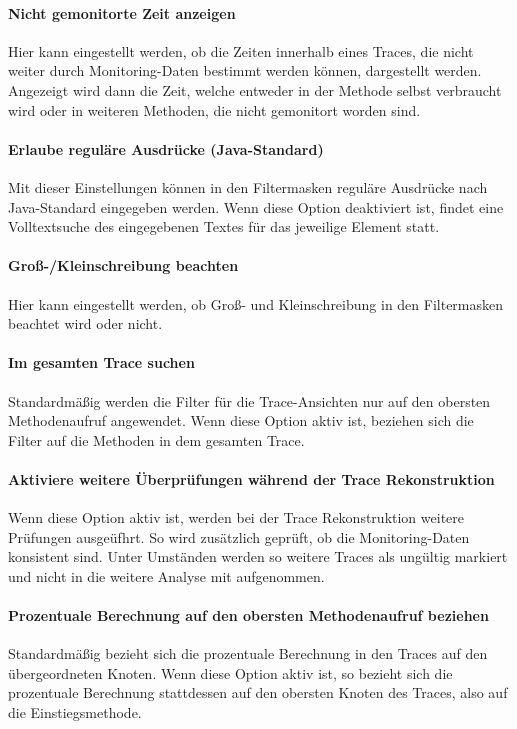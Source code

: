 \documentclass{article}
\begin{document}
  \paragraph{Nicht gemonitorte Zeit anzeigen}
  Hier kann eingestellt werden, ob die Zeiten innerhalb eines Traces, die nicht weiter durch Monitoring-Daten bestimmt werden können, dargestellt werden.
  Angezeigt wird dann die Zeit, welche entweder in der Methode selbst verbraucht wird oder in weiteren Methoden, die nicht gemonitort worden sind. 

  \paragraph{Erlaube reguläre Ausdrücke (Java-Standard)}
  Mit dieser Einstellungen können in den Filtermasken reguläre Ausdrücke nach Java-Standard eingegeben werden.
  Wenn diese Option deaktiviert ist, findet eine Volltextsuche des eingegebenen Textes für das jeweilige Element statt.

  \paragraph{Groß-/Kleinschreibung beachten}
  Hier kann eingestellt werden, ob Groß- und Kleinschreibung in den Filtermasken beachtet wird oder nicht.

  \paragraph{Im gesamten Trace suchen} 
  Standardmäßig werden die Filter für die Trace-Ansichten nur auf den obersten Methodenaufruf angewendet.
  Wenn diese Option aktiv ist, beziehen sich die Filter auf die Methoden in dem gesamten Trace.

  \paragraph{Aktiviere weitere Überprüfungen während der Trace Rekonstruktion}
  Wenn diese Option aktiv ist, werden bei der Trace Rekonstruktion weitere Prüfungen ausgeüfhrt.
  So wird zusätzlich geprüft, ob die Monitoring-Daten konsistent sind.
  Unter Umständen werden so weitere Traces als ungültig markiert und nicht in die weitere Analyse mit aufgenommen.

  \paragraph{Prozentuale Berechnung auf den obersten Methodenaufruf beziehen}
  Standardmäßig bezieht sich die prozentuale Berechnung in den Traces auf den übergeordneten Knoten.
  Wenn diese Option aktiv ist, so bezieht sich die prozentuale Berechnung stattdessen auf den obersten Knoten des Traces, also auf die Einstiegsmethode.
\end{document}
